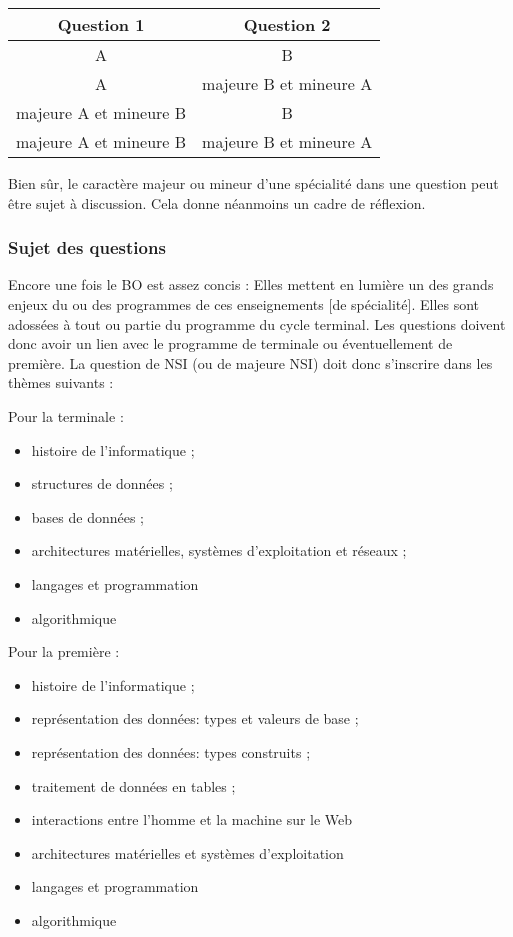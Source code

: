 \documentclass[
  letterpaper,
  DIV=11,
  numbers=noendperiod]{scrartcl}
\providecommand{\tightlist}{%
  \setlength{\itemsep}{0pt}\setlength{\parskip}{0pt}}\usepackage{longtable,booktabs,array}
\begin{document}
\begin{longtable}[]{@{}cc@{}}
\toprule\noalign{}
Question 1 & Question 2 \\
\midrule\noalign{}
\endhead
\bottomrule\noalign{}
\endlastfoot
A & B \\
A & majeure B et mineure A \\
majeure A et mineure B & B \\
majeure A et mineure B & majeure B et mineure A \\
\end{longtable}

Bien sûr, le caractère majeur ou mineur d'une spécialité dans une
question peut être sujet à discussion. Cela donne néanmoins un cadre de
réflexion.

\hypertarget{sujet-des-questions}{%
\subsubsection{Sujet des questions}\label{sujet-des-questions}}

Encore une fois le BO est assez concis : Elles mettent en lumière un des
grands enjeux du ou des programmes de ces enseignements {[}de
spécialité{]}. Elles sont adossées à tout ou partie du programme du
cycle terminal. Les questions doivent donc avoir un lien avec le
programme de terminale ou éventuellement de première. La question de NSI
(ou de majeure NSI) doit donc s'inscrire dans les thèmes suivants :

Pour la terminale :

\begin{itemize}
\tightlist
\item
  histoire de l'informatique ;
\item
  structures de données ;
\item
  bases de données ;
\item
  architectures matérielles, systèmes d'exploitation et réseaux ;
\item
  langages et programmation
\item
  algorithmique
\end{itemize}

Pour la première :

\begin{itemize}
\tightlist
\item
  histoire de l'informatique ;
\item
  représentation des données: types et valeurs de base ;
\item
  représentation des données: types construits ;
\item
  traitement de données en tables ;
\item
  interactions entre l'homme et la machine sur le Web
\item
  architectures matérielles et systèmes d'exploitation
\item
  langages et programmation
\item
  algorithmique
\end{itemize}
\end{document}
